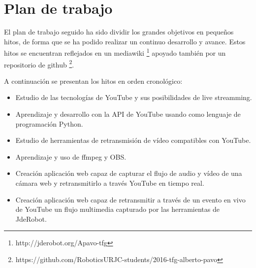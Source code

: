 \section{Plan de trabajo}

El plan de trabajo seguido ha sido dividir los grandes objetivos en pequeños hitos, de forma que se ha podido realizar un  continuo desarrollo y avance. Estos hitos se encuentran reflejados en un mediawiki \footnote{http://jderobot.org/Apavo-tfg}  apoyado también por un repositorio de github \footnote{https://github.com/RoboticsURJC-students/2016-tfg-alberto-pavo}.

A continuación se presentan los hitos en orden cronológico:

\begin{itemize}
    \item Estudio de las tecnologías de YouTube y sus posibilidades de live streamming.
    \item Aprendizaje y desarrollo con la API de YouTube usando como lenguaje de programación Python.
    \item Estudio de herramientas de retransmisión de vídeo compatibles con YouTube.
    \item Aprendizaje y uso de ffmpeg y OBS.
    \item Creación aplicación web capaz de capturar el flujo de audio y vídeo de una cámara web y retransmitirlo a través  YouTube en tiempo real.
    \item Creación aplicación web capaz de retransmitir a través de un evento en vivo de YouTube un flujo multimedia capturado por las herramientas de JdeRobot.

\end{itemize}